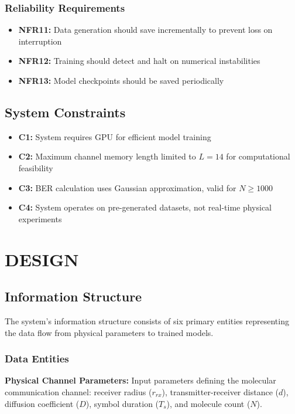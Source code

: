 \documentclass[a4paper,12pt]{report}
\begin{document}
\subsection{Reliability Requirements}
\begin{itemize}
    \item \textbf{NFR11:} Data generation should save incrementally to prevent loss on interruption
    \item \textbf{NFR12:} Training should detect and halt on numerical instabilities
    \item \textbf{NFR13:} Model checkpoints should be saved periodically
\end{itemize}

\section{System Constraints}

\begin{itemize}
    \item \textbf{C1:} System requires GPU for efficient model training
    \item \textbf{C2:} Maximum channel memory length limited to $L = 14$ for computational feasibility
    \item \textbf{C3:} BER calculation uses Gaussian approximation, valid for $N \geq 1000$
    \item \textbf{C4:} System operates on pre-generated datasets, not real-time physical experiments
\end{itemize}

\chapter{DESIGN}

\section{Information Structure}

The system's information structure consists of six primary entities representing the data flow from physical parameters to trained models.

\subsection{Data Entities}

\textbf{Physical Channel Parameters:}
Input parameters defining the molecular communication channel: receiver radius ($r_{rx}$), transmitter-receiver distance ($d$), diffusion coefficient ($D$), symbol duration ($T_s$), and molecule count ($N$).
\end{document}
